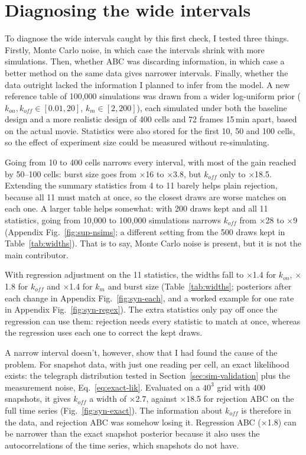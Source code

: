 \section{Diagnosing the wide intervals}\label{sec:syn-diagnosis}

To diagnose the wide intervals caught by this first check, I tested three things. Firstly, Monte Carlo noise, in which case the intervals shrink with more simulations. Then, whether ABC was discarding information, in which case a better method on the same data gives narrower intervals. Finally, whether the data outright lacked the information I planned to infer from the model. A new reference table of 100,000 simulations was drawn from a wider log-uniform prior ($k_{on}, k_{off} \in [0.01, 20]$, $k_m \in [2, 200]$), each simulated under both the baseline design and a more realistic design of 400 cells and 72 frames 15\,min apart, based on the actual movie. Statistics were also stored for the first 10, 50 and 100 cells, so the effect of experiment size could be measured without re-simulating.

Going from 10 to 400 cells narrows every interval, with most of the gain reached by 50--100 cells: burst size goes from $\times$16 to $\times$3.8, but $k_{off}$ only to $\times$18.5. Extending the summary statistics from 4 to 11 barely helps plain rejection, because all 11 must match at once, so the closest draws are worse matches on each one. A larger table helps somewhat: with 200 draws kept and all 11 statistics, going from 10,000 to 100,000 simulations narrows $k_{off}$ from $\times$28 to $\times$9 (Appendix Fig.~\ref{fig:sup-nsims}; a different setting from the 500 draws kept in Table~\ref{tab:widths}). That is to say, Monte Carlo noise is present, but it is not the main contributor.

With regression adjustment on the 11 statistics, the widths fall to $\times$1.4 for $k_{on}$, $\times$1.8 for $k_{off}$ and $\times$1.4 for $k_m$ and burst size (Table~\ref{tab:widths}; posteriors after each change in Appendix Fig.~\ref{fig:syn-each}, and a worked example for one rate in Appendix Fig.~\ref{fig:syn-regex}). The extra statistics only pay off once the regression can use them: rejection needs every statistic to match at once, whereas the regression uses each one to correct the kept draws.

A narrow interval doesn't, however, show that I had found the cause of the problem. For snapshot data, with just one reading per cell, an exact likelihood exists: the telegraph distribution tested in Section~\ref{sec:sim-validation} plus the measurement noise, Eq.~\eqref{eq:exact-lik}. Evaluated on a $40^3$ grid with 400 snapshots, it gives $k_{off}$ a width of $\times$2.7, against $\times$18.5 for rejection ABC on the full time series (Fig.~\ref{fig:syn-exact}). The information about $k_{off}$ is therefore in the data, and rejection ABC was somehow losing it. Regression ABC ($\times$1.8) can be narrower than the exact snapshot posterior because it also uses the autocorrelations of the time series, which snapshots do not have.

